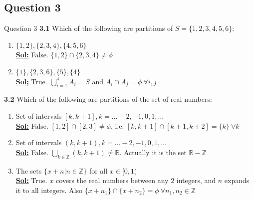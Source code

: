 \documentclass[xcolor=svgnames]{beamer}
\begin{document}
\subsection{Question 3}

\begin{frame}{Question 3}
    \textbf{3.1} Which of the following are partitions of $S = \{1, 2, 3, 4, 5, 6\}$:
    \begin{enumerate}
        \item $\{1, 2\}, \{2, 3, 4\}, \{4, 5, 6\}$
        \\\textbf{\underline{Sol:}} False. $\{1, 2\} \cap \{2,3,4\} \neq \phi$
        \item $\{1\}, \{2, 3, 6\}, \{5\}, \{4\}$
        \\\textbf{\underline{Sol;}} True. $\bigcup_{i=1}^4 A_i = S$ and $A_i \cap A_j = \phi\  \forall i, j$
    \end{enumerate}
    \textbf{3.2} Which of the following are partitions of the set of real numbers:
    \begin{enumerate}
        \item Set of intervals $[k, k+1], k =\ldots -2, -1, 0, 1, \ldots$
        \\\textbf{\underline{Sol:}} False. $[1, 2] \cap [2, 3] \neq \phi$, i.e. $[k, k+1] \cap [k+1, k+2] = \{k\}\  \forall k$
        \item Set of intervals $(k, k+1), k =\ldots -2, -1, 0, 1, \ldots$
        \\\textbf{\underline{Sol:}} False. $\bigcup_{k \in \mathbb{Z}} (k, k+1) \neq \mathbb{R}$. Actually it is the set $\mathbb{R} - \mathbb{Z}$
        \item The sets $\{x + n | n \in \mathbb{Z}\}$ for all $x \in [0, 1)$
        \\\textbf{\underline{Sol:}} True. $x$ covers the real numbers between any $2$ integers, and $n$ expands it to all integers. Also $\{x + n_1\} \cap \{x + n_2\} = \phi \ \forall n_1, n_2 \in \mathbb{Z}$
    \end{enumerate}
\end{frame}
\end{document}
